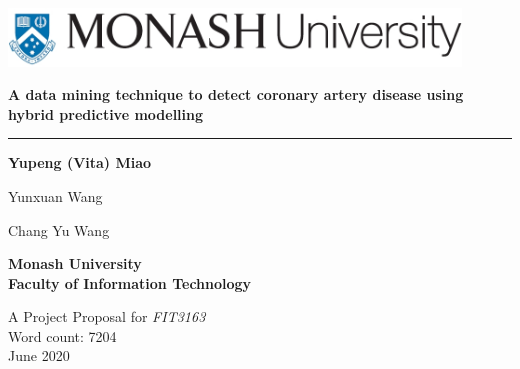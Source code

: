 \documentclass[a4paper, 12pt]{article}
\begin{document}
\begin{titlepage}
\addtolength{\hoffset}{0cm}
	\centering
	\includegraphics[width=0.90\textwidth]{monash1line.jpg}\par\vspace{2cm}
	{\LARGE\bfseries A data mining technique to detect coronary artery disease using hybrid predictive modelling \par}
	\medskip\medskip
	\hrule
	\vspace{3cm}
	{\Large\bfseries Yupeng (Vita) Miao \par
	\medskip
	Yunxuan Wang \par
	\medskip
	Chang Yu Wang \par}
    \vspace{3cm}
    
   {\Large\bfseries Monash University\\}
    \medskip
    \large\textbf{Faculty of Information Technology\\}
    
    \vspace{3cm}
	\large{A Project Proposal for \textit {FIT3163}}\\
	\vspace{2cm}
	Word count: 7204\\
	\vfill
	{\large  June 2020}
\end{titlepage}
\onehalfspacing
\tableofcontents
\pagebreak
\onehalfspacing
\end{document}

